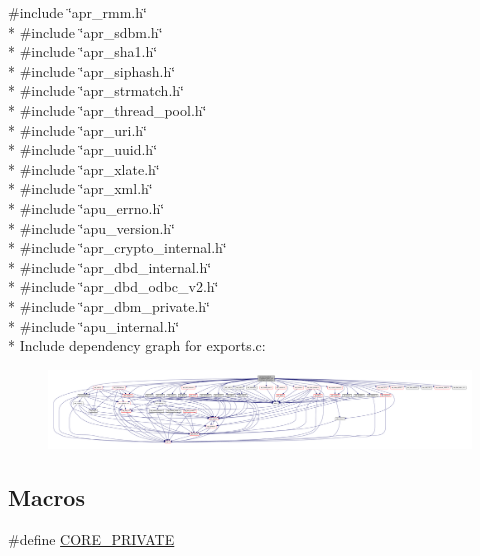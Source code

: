 {\ttfamily \#include \char`\"{}apr\+\_\+rmm.\+h\char`\"{}}\\*
{\ttfamily \#include \char`\"{}apr\+\_\+sdbm.\+h\char`\"{}}\\*
{\ttfamily \#include \char`\"{}apr\+\_\+sha1.\+h\char`\"{}}\\*
{\ttfamily \#include \char`\"{}apr\+\_\+siphash.\+h\char`\"{}}\\*
{\ttfamily \#include \char`\"{}apr\+\_\+strmatch.\+h\char`\"{}}\\*
{\ttfamily \#include \char`\"{}apr\+\_\+thread\+\_\+pool.\+h\char`\"{}}\\*
{\ttfamily \#include \char`\"{}apr\+\_\+uri.\+h\char`\"{}}\\*
{\ttfamily \#include \char`\"{}apr\+\_\+uuid.\+h\char`\"{}}\\*
{\ttfamily \#include \char`\"{}apr\+\_\+xlate.\+h\char`\"{}}\\*
{\ttfamily \#include \char`\"{}apr\+\_\+xml.\+h\char`\"{}}\\*
{\ttfamily \#include \char`\"{}apu\+\_\+errno.\+h\char`\"{}}\\*
{\ttfamily \#include \char`\"{}apu\+\_\+version.\+h\char`\"{}}\\*
{\ttfamily \#include \char`\"{}apr\+\_\+crypto\+\_\+internal.\+h\char`\"{}}\\*
{\ttfamily \#include \char`\"{}apr\+\_\+dbd\+\_\+internal.\+h\char`\"{}}\\*
{\ttfamily \#include \char`\"{}apr\+\_\+dbd\+\_\+odbc\+\_\+v2.\+h\char`\"{}}\\*
{\ttfamily \#include \char`\"{}apr\+\_\+dbm\+\_\+private.\+h\char`\"{}}\\*
{\ttfamily \#include \char`\"{}apu\+\_\+internal.\+h\char`\"{}}\\*
Include dependency graph for exports.\+c\+:
\nopagebreak
\begin{figure}[H]
\begin{center}
\leavevmode
\includegraphics[width=350pt]{srclib_2apr-util_2exports_8c__incl}
\end{center}
\end{figure}
\subsection*{Macros}
\begin{DoxyCompactItemize}
\item 
\#define \hyperlink{srclib_2apr-util_2exports_8c_ae4fb8f46fdb84502b5d4e5eba86405c5}{C\+O\+R\+E\+\_\+\+P\+R\+I\+V\+A\+TE}
\end{DoxyCompactItemize}
